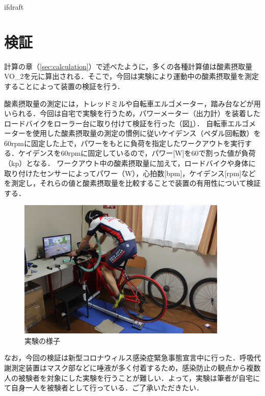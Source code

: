 \expandafter\ifx\csname ifdraft\endcsname\relax
 
\fi

\section{検証}

計算の章（\ref{sec:calculation}）で述べたように，多くの各種計算値は酸素摂取量VO_2を元に算出される．そこで，今回は実験により運動中の酸素摂取量を測定することによって装置の検証を行う．

酸素摂取量の測定には，トレッドミルや自転車エルゴメーター，踏み台などが用いられる．今回は自宅で実験を行うため，パワーメーター（出力計）を装着したロードバイクをローラー台に取り付けて検証を行った（図\ref{fig:bike_in_use}）．
自転車エルゴメーターを使用した酸素摂取量の測定の慣例に従いケイデンス（ペダル回転数）を60rpmに固定した上で，パワーをもとに負荷を指定したワークアウトを実行する．ケイデンスを60rpmに固定しているので，パワー[W]を60で割った値が負荷（kp）となる．
ワークアウト中の酸素摂取量に加えて，ロードバイクや身体に取り付けたセンサーによってパワー（W），心拍数[bpm]，ケイデンス[rpm]などを測定し，それらの値と酸素摂取量を比較することで装置の有用性について検証する．

\begin{figure}[H]
  \begin{center}
    \includegraphics[width=10cm]{fig/bike_in_use}
    \caption{実験の様子}
    \label{fig:bike_in_use}
  \end{center}
\end{figure}

なお，今回の検証は新型コロナウィルス感染症緊急事態宣言中に行った．呼吸代謝測定装置はマスク部などに唾液が多く付着するため，感染防止の観点から複数人の被験者を対象にした実験を行うことが難しい．よって，実験は筆者が自宅にて自身一人を被験者として行っている．ご了承いただきたい．

